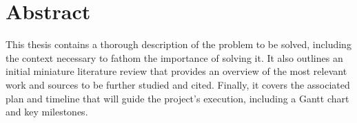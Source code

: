 \chapter{Abstract}
This thesis contains a thorough description of the problem to be solved, including the context necessary to fathom the importance of solving it.
It also outlines an initial miniature literature review that provides an overview of the most relevant work and sources to be further studied and cited.
Finally, it covers the associated plan and timeline that will guide the project's execution, including a Gantt chart and key milestones.
